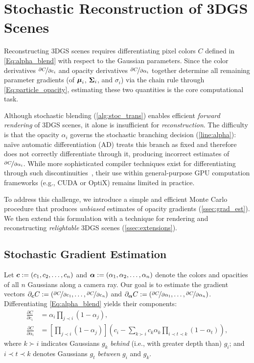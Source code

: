 \section{Stochastic Reconstruction of 3DGS Scenes}
\label{sec:method}
%
Reconstructing 3DGS scenes requires differentiating pixel colors $C$ defined in \autoref{Eq:alpha_blend} with respect to the Gaussian parameters.
Since the color derivatives $\nicefrac{\partial C}{\partial c_i}$ and opacity derivatives $\nicefrac{\partial C}{\partial \alpha_i}$ together determine all remaining parameter gradients (of $\boldsymbol{\mu}_i$, $\boldsymbol{\Sigma}_i$, and $\sigma_i$) via the chain rule through \autoref{Eq:particle_opacity}, estimating these two quantities is the core computational task.

Although stochastic blending (\autoref{alg:stoc_trans}) enables efficient \emph{forward rendering} of 3DGS scenes, it alone is insufficient for \emph{reconstruction}.
The difficulty is that the opacity $\alpha_i$ governs the stochastic branching decision (\autoref{line:alpha}): na\"ive automatic differentiation (AD) treats this branch as fixed and therefore does not correctly differentiate through it, producing incorrect estimates of $\nicefrac{\partial C}{\partial \alpha_i}$.
While more sophisticated compiler techniques exist for differentiating through such discontinuities~\cite{Bangaru:2021}, their use within general-purpose GPU computation frameworks (e.g., CUDA or OptiX) remains limited in practice.

To address this challenge, we introduce a simple and efficient Monte Carlo procedure that produces \emph{unbiased} estimates of opacity gradients (\autoref{ssec:grad_est}).
We then extend this formulation with a technique for rendering and reconstructing \emph{relightable} 3DGS scenes (\autoref{ssec:extensions}).


\subsection{Stochastic Gradient Estimation}
\label{ssec:grad_est}
%
Let $\boldsymbol{c} := (c_1, c_2, \ldots, c_n)$ and $\boldsymbol{\alpha} := (\alpha_1, \alpha_2, \ldots, \alpha_n)$ denote the colors and opacities of all $n$ Gaussians along a camera ray.
Our goal is to estimate the gradient vectors $\partial_{\boldsymbol{c}} C := (\nicefrac{\partial C}{\partial c_1}, \ldots, \nicefrac{\partial C}{\partial c_n})$ and $\partial_{\boldsymbol{\alpha}} C := (\nicefrac{\partial C}{\partial\alpha_1}, \ldots, \nicefrac{\partial C}{\partial\alpha_n})$.
Differentiating \autoref{Eq:alpha_blend} yields their components:
%
\begin{align}
	\frac{\partial C}{\partial c_i}
	 & = \alpha_i \prod_{j \prec i} (1 - \alpha_j),
	\\
	\frac{\partial C}{\partial\alpha_i}
	 & = \left[ \prod_{j \prec i}(1 - \alpha_j) \right] \!\!\left( c_i - \sum_{k \succ i} c_k \alpha_k \prod_{i \prec t \prec k}(1 - \alpha_t) \right),
\end{align}
%
where $k \succ i$ indicates Gaussians $g_k$ \emph{behind} (i.e., with greater depth than) $g_i$; and $i \prec t \prec k$ denotes Gaussians $g_t$ \emph{between} $g_i$ and $g_k$.


